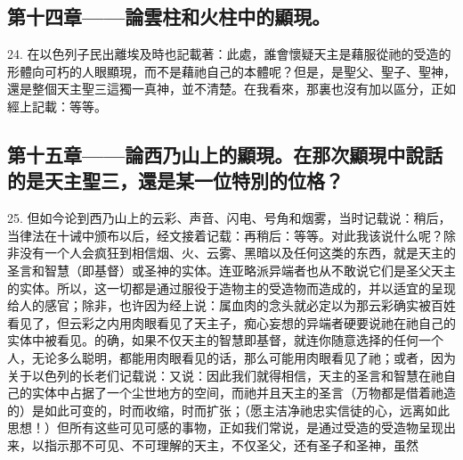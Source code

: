
\subsection{第十四章——論雲柱和火柱中的顯現。}

24. 在以色列子民出離埃及時也記載著：此處，誰會懷疑天主是藉服從祂的受造的形體向可朽的人眼顯現，而不是藉祂自己的本體呢？但是，是聖父、聖子、聖神，還是整個天主聖三這獨一真神，並不清楚。在我看來，那裏也沒有加以區分，正如經上記載：等等。\par


\subsection{第十五章——論西乃山上的顯現。在那次顯現中說話的是天主聖三，還是某一位特別的位格？}

25. 但如今论到西乃山上的云彩、声音、闪电、号角和烟雾，当时记载说：稍后，当律法在十诫中颁布以后，经文接着记载：再稍后：等等。对此我该说什么呢？除非没有一个人会疯狂到相信烟、火、云雾、黑暗以及任何这类的东西，就是天主的圣言和智慧（即基督）或圣神的实体。连亚略派异端者也从不敢说它们是圣父天主的实体。所以，这一切都是通过服役于造物主的受造物而造成的，并以适宜的呈现给人的感官；除非，也许因为经上说：属血肉的念头就必定以为那云彩确实被百姓看见了，但云彩之内用肉眼看见了天主子，痴心妄想的异端者硬要说祂在祂自己的实体中被看见。的确，如果不仅天主的智慧即基督，就连你随意选择的任何一个人，无论多么聪明，都能用肉眼看见的话，那么可能用肉眼看见了祂；或者，因为关于以色列的长老们记载说：又说：因此我们就得相信，天主的圣言和智慧在祂自己的实体中占据了一个尘世地方的空间，而祂并且天主的圣言（万物都是借着祂造的）是如此可变的，时而收缩，时而扩张；（愿主洁净祂忠实信徒的心，远离如此思想！）但所有这些可见可感的事物，正如我们常说，是通过受造的受造物呈现出来，以指示那不可见、不可理解的天主，不仅圣父，还有圣子和圣神，虽然\par

